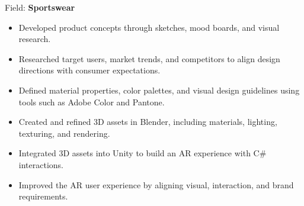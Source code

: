 { Field:  \textbf{Sportswear}
\vspace{0.1cm}
\begin{itemize}
\item Developed product concepts through sketches, mood boards, and visual research.
\item Researched target users, market trends, and competitors to align design directions with consumer expectations.
\item Defined material properties, color palettes, and visual design guidelines using tools such as Adobe Color and Pantone.
\item Created and refined 3D assets in Blender, including materials, lighting, texturing, and rendering.
\item Integrated 3D assets into Unity to build an AR experience with C# interactions.
\item Improved the AR user experience by aligning visual, interaction, and brand requirements.
\end{itemize}}